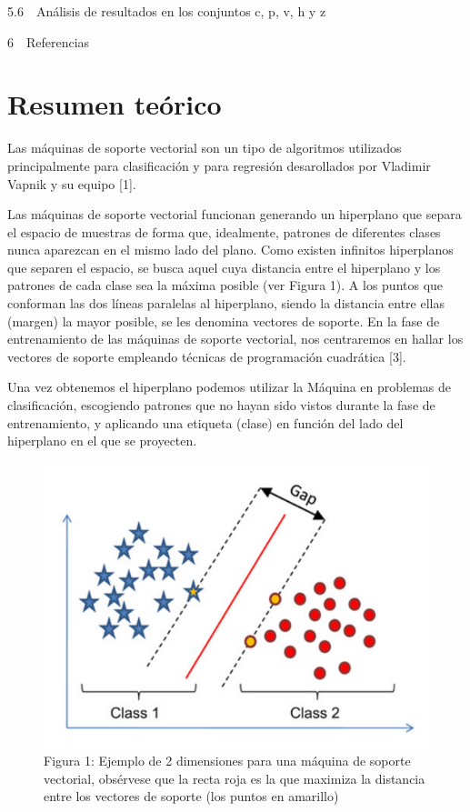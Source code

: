 \documentclass[11pt]{article}
\makeatletter
\def\maxwidth{\ifdim\Gin@nat@width>\linewidth\linewidth
    \else\Gin@nat@width\fi}
\let\Oldincludegraphics\includegraphics
\renewcommand{\includegraphics}[1]{\Oldincludegraphics[width=.8\maxwidth]{#1}}
\makeatother
\begin{document}
{5.6~~}Análisis de resultados en los conjuntos c, p, v, h y z

{6~~}Referencias

    \section{Resumen teórico}\label{resumen-teuxf3rico}

Las máquinas de soporte vectorial son un tipo de algoritmos utilizados
principalmente para clasificación y para regresión desarollados por
Vladimir Vapnik y su equipo {[}1{]}.

Las máquinas de soporte vectorial funcionan generando un hiperplano que
separa el espacio de muestras de forma que, idealmente, patrones de
diferentes clases nunca aparezcan en el mismo lado del plano. Como
existen infinitos hiperplanos que separen el espacio, se busca aquel
cuya distancia entre el hiperplano y los patrones de cada clase sea la
máxima posible (ver Figura 1). A los puntos que conforman las dos líneas
paralelas al hiperplano, siendo la distancia entre ellas (margen) la
mayor posible, se les denomina vectores de soporte. En la fase de
entrenamiento de las máquinas de soporte vectorial, nos centraremos en
hallar los vectores de soporte empleando técnicas de programación
cuadrática {[}3{]}.

Una vez obtenemos el hiperplano podemos utilizar la Máquina en problemas
de clasificación, escogiendo patrones que no hayan sido vistos durante
la fase de entrenamiento, y aplicando una etiqueta (clase) en función
del lado del hiperplano en el que se proyecten.

\begin{figure}
\centering
\includegraphics{esquema-basico-svm.PNG}
\caption{Figura 1: Ejemplo de 2 dimensiones para una máquina de soporte
vectorial, obsérvese que la recta roja es la que maximiza la distancia
entre los vectores de soporte (los puntos en amarillo)}
\end{figure}
\end{document}
